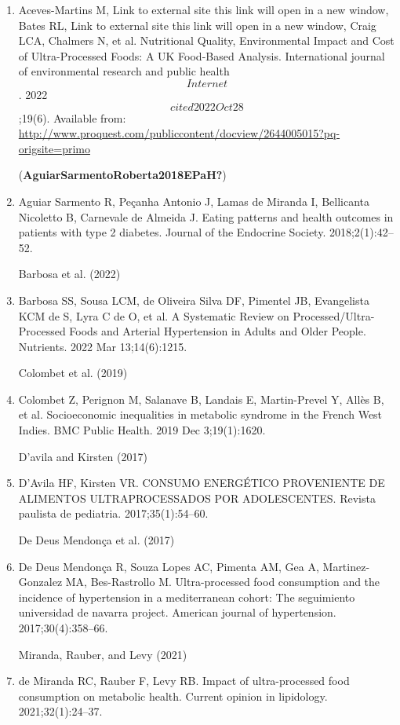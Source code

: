 \documentclass[
]{article}
\begin{document}
\begin{enumerate}
\def\labelenumi{\arabic{enumi}.}
\item
  Aceves-Martins M, Link to external site this link will open in a new
  window, Bates RL, Link to external site this link will open in a new
  window, Craig LCA, Chalmers N, et al. Nutritional Quality,
  Environmental Impact and Cost of Ultra-Processed Foods: A UK
  Food-Based Analysis. International journal of environmental research
  and public health \[Internet\]. 2022 \[cited 2022 Oct 28\];19(6).
  Available from:
  \url{http://www.proquest.com/publiccontent/docview/2644005015?pq-origsite=primo}

  (\textbf{AguiarSarmentoRoberta2018EPaH?})
\item
  Aguiar Sarmento R, Peçanha Antonio J, Lamas de Miranda I, Bellicanta
  Nicoletto B, Carnevale de Almeida J. Eating patterns and health
  outcomes in patients with type 2 diabetes. Journal of the Endocrine
  Society. 2018;2(1):42--52.

  Barbosa et al. (2022)
\item
  Barbosa SS, Sousa LCM, de Oliveira Silva DF, Pimentel JB, Evangelista
  KCM de S, Lyra C de O, et al. A Systematic Review on
  Processed/Ultra-Processed Foods and Arterial Hypertension in Adults
  and Older People. Nutrients. 2022 Mar 13;14(6):1215.

  Colombet et al. (2019)
\item
  Colombet Z, Perignon M, Salanave B, Landais E, Martin-Prevel Y, Allès
  B, et al. Socioeconomic inequalities in metabolic syndrome in the
  French West Indies. BMC Public Health. 2019 Dec 3;19(1):1620.

  D'avila and Kirsten (2017)
\item
  D'Avila HF, Kirsten VR. CONSUMO ENERGÉTICO PROVENIENTE DE ALIMENTOS
  ULTRAPROCESSADOS POR ADOLESCENTES. Revista paulista de pediatria.
  2017;35(1):54--60.

  De Deus Mendonça et al. (2017)
\item
  De Deus Mendonça R, Souza Lopes AC, Pimenta AM, Gea A,
  Martinez-Gonzalez MA, Bes-Rastrollo M. Ultra-processed food
  consumption and the incidence of hypertension in a mediterranean
  cohort: The seguimiento universidad de navarra project. American
  journal of hypertension. 2017;30(4):358--66.

  Miranda, Rauber, and Levy (2021)
\item
  de Miranda RC, Rauber F, Levy RB. Impact of ultra-processed food
  consumption on metabolic health. Current opinion in lipidology.
  2021;32(1):24--37.


\end{enumerate}
\end{document}
